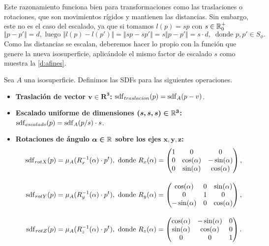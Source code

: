 Este razonamiento funciona bien para transformaciones como las traslaciones o rotaciones, que son movimientos rígidos y mantienen las distancias. Sin embargo, este no es el caso del escalado, ya que si tomamos $l(p) = sp$ con $s\in \mathbb{R}^+_0$
\begin{equation*}
    \Vert p-p'\Vert = d, \text{ luego }  \Vert l(p)-l(p')\Vert = \Vert sp-sp'\Vert = s\Vert p-p'\Vert = s\cdot d,\  \text{ donde } p,p' \in S_{\phi}.
\end{equation*}
Como las distancias se escalan, deberemos hacer lo propio con la función que genere la nueva isosuperficie, aplicándole el mismo factor de escalado $s$ como muestra la \autoref{d:afines}.

\begin{definicion}\label{d:afines}
    Sea $A$ una isosuperficie. Definimos las SDFs para las siguientes operaciones.
    \begin{itemize}
        \item \textbf{Traslación de vector $\boldsymbol{v\in R^3}$: } $\operatorname{sdf}_{traslacion}(p) = \operatorname{sdf}_{A}(p - v)$.
        \item \textbf{Escalado uniforme de dimensiones $\boldsymbol{(s,s,s)\in \mathbb{R}^3}$: } $\operatorname{sdf}_{escalado}(p) = \operatorname{sdf}_{A}(p/s)\cdot s$.
        \item \textbf{Rotaciones de ángulo $\boldsymbol{\alpha\in \mathbb{R}}$ sobre los ejes $\boldsymbol{x,y,z}$: }
        \begin{align*}
            \sdf_{rotX}(p) &= \mu_{A}(R_x^{-1}(\alpha)\cdot p^t),\ \text{donde } R_x(\alpha) = 
            \begin{pmatrix}
                1&0&0\\
                0&\cos(\alpha) & -\sin(\alpha) \\
                0&\sin(\alpha) & \cos(\alpha) 
                \end{pmatrix},\\[10pt] 
            \sdf_{rotY}(p) &= \mu_{A}(R_y^{-1}(\alpha)\cdot p^t),\ \text{donde } R_y(\alpha) = \begin{pmatrix}
            \cos(\alpha) &0& \sin(\alpha)\\
            0&1&0\\
            -\sin(\alpha) &0& \cos(\alpha) 
            \end{pmatrix},\\[10pt]
            \sdf_{rotZ}(p) &= \mu_{A}(R_z^{-1}(\alpha)\cdot p^t),\ \text{donde } R_z(\alpha) = \begin{pmatrix}
            \cos(\alpha) & -\sin(\alpha) & 0\\
            \sin(\alpha) & \cos(\alpha) & 0\\
            0&0&1
            \end{pmatrix}.
        \end{align*}
    \end{itemize}
\end{definicion}

